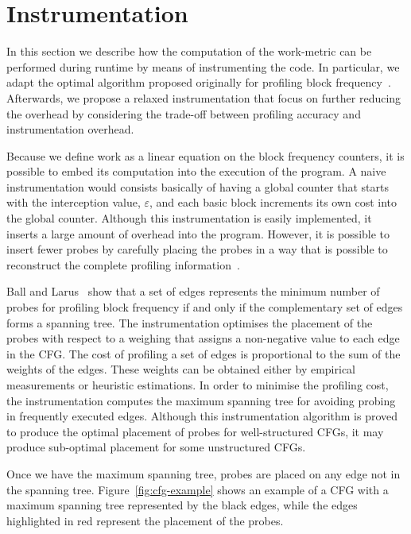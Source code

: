 \documentclass[sigplan,9pt]{acmart}
\begin{document}
\section{Instrumentation}

In this section we describe how the computation of the work-metric can be performed during runtime by means of instrumenting the code.
In particular, we adapt the optimal algorithm proposed originally for profiling block frequency~\cite{knuth73,ball94}.
Afterwards, we propose a relaxed instrumentation that focus on further reducing the overhead by considering the trade-off between profiling accuracy and instrumentation overhead.

Because we define work as a linear equation on the block frequency counters, it is possible to embed its computation into the execution of the program.
A naive instrumentation would consists basically of having a global counter that starts with the interception value, $\varepsilon$, and each basic block increments its own cost into the global counter.
Although this instrumentation is easily implemented, it inserts a large amount of overhead into the program.
However, it is possible to insert fewer probes by carefully placing the probes in a way that is possible to reconstruct the complete profiling information~\cite{knuth73,ball94}.

Ball and Larus~\cite{ball94} show that a set of edges represents the minimum number of probes for profiling block frequency if and only if the complementary set of edges forms a spanning tree.
The instrumentation optimises the placement of the probes with respect to a weighing that assigns a non-negative value to each edge in the CFG.
The cost of profiling a set of edges is proportional to the sum of the weights of the edges.
These weights can be obtained either by empirical measurements or heuristic estimations.
In order to minimise the profiling cost, the instrumentation computes the maximum spanning tree for avoiding probing in frequently executed edges.
Although this instrumentation algorithm is proved to produce the optimal placement of probes for well-structured CFGs, it may produce sub-optimal placement for some unstructured CFGs.

Once we have the maximum spanning tree, probes are placed on any edge not in the spanning tree. Figure~\ref{fig:cfg-example} shows an example of a CFG with a maximum spanning tree represented by the black edges, while the edges highlighted in red represent the placement of the probes.
\end{document}
